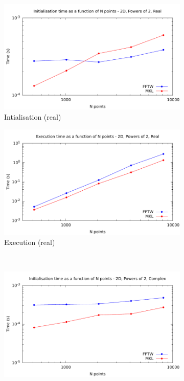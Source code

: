 \documentclass[12pt, a4paper]{article}
\begin{document}
\begin{figure}[H]
\captionsetup{width=0.8\linewidth}
\centering
\begin{subfigure}{.5\textwidth}
\centering
\includegraphics[width=.9\linewidth]{graphs/2d-pow2-init-r.pdf}
\caption{Intialisation (real)}
\label{2DPOW2RI}
\end{subfigure}%
\begin{subfigure}{.5\textwidth}
\centering
\includegraphics[width=.9\linewidth]{graphs/2d-pow2-exec-r.pdf}
\caption{Execution (real)}
\label{2DPOW2R}
\end{subfigure}\\
\begin{subfigure}{.5\textwidth}
\centering
\includegraphics[width=.9\linewidth]{graphs/2d-pow2-init-c.pdf}

\end{subfigure}
\end{figure}
\end{document}
